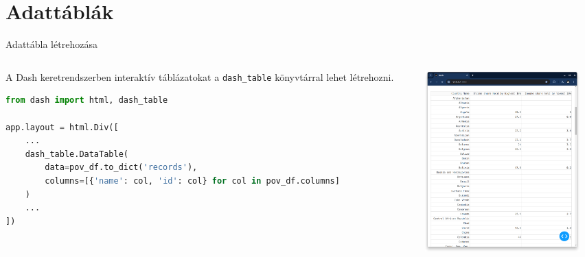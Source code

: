 \documentclass[english, aspectratio=169]{beamer}
\makeatletter
\let\origtableofcontents=\tableofcontents
\def\tableofcontents{\@ifnextchar[{\origtableofcontents}{\gobbletableofcontents}}
\def\gobbletableofcontents#1{\origtableofcontents}
\makeatother
\begin{document}
	\section{Adattáblák}
	
	\begin{frame}{}
		\tableofcontents[currentsection]
	\end{frame}
	
	\begin{frame}[fragile]{Adattábla létrehozása}
		\begin{columns}
			\begin{column}{.5\textwidth}
				A Dash keretrendszerben interaktív táblázatokat a \texttt{dash\_table} könyvtárral lehet létrehozni.\par\medskip
				\begin{lstlisting}[language=python]
from dash import html, dash_table

app.layout = html.Div([
	...
	dash_table.DataTable(
		data=pov_df.to_dict('records'),
		columns=[{'name': col, 'id': col} for col in pov_df.columns]
	)
	...
])
	
				\end{lstlisting}
			\end{column}
			\begin{column}{.5\textwidth}
				\begin{center}
					\includegraphics[width=7cm, height=7cm, keepaspectratio]{images/freq_12.png}
				\end{center}
			\end{column}
		\end{columns}
	\end{frame}
	
\end{document}
